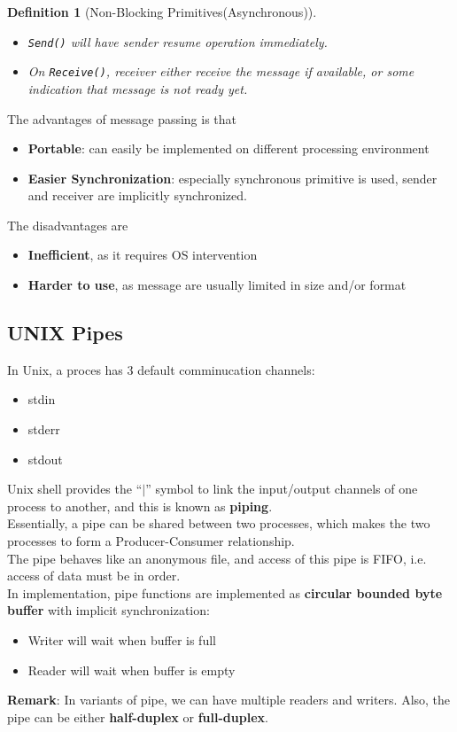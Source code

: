 \documentclass[11pt]{article}
\newtheorem{definition}{Definition}[section]
\theoremstyle{definition}
\begin{document}
\begin{definition}[Non-Blocking Primitives(Asynchronous)]
\normalfont 
\begin{itemize}[itemsep=0pt]
  \item \texttt{Send()} will have sender resume operation immediately.
  \item On \texttt{Receive()}, receiver either receive the message if available, or some indication that message is not ready yet.
\end{itemize}
\end{definition} 
The advantages of message passing is that
\begin{itemize}[itemsep=0pt]
  \item \textbf{Portable}: can easily be implemented on different processing environment
  \item \textbf{Easier Synchronization}: especially synchronous primitive is used, sender and receiver are implicitly synchronized.
\end{itemize}
The disadvantages are 
\begin{itemize}[itemsep=0pt]
  \item \textbf{Inefficient}, as it requires OS intervention
  \item \textbf{Harder to use}, as message are usually limited in size and/or format
\end{itemize}
\subsection{UNIX Pipes}
In Unix, a proces has 3 default comminucation channels:
\begin{itemize}[itemsep=0pt]
  \item stdin
  \item stderr
  \item stdout
\end{itemize}
Unix shell provides the ``$\mid$'' symbol to link the input/output channels of one process to another, and this is known as \textbf{piping}.\\
Essentially, a pipe can be shared between two processes, which makes the two processes to form a Producer-Consumer relationship.\\
The pipe behaves like an anonymous file, and access of this pipe is FIFO, i.e. access of data must be in order.\\

In implementation, pipe functions are implemented as \textbf{circular bounded byte buffer} with implicit synchronization:
\begin{itemize}[itemsep=0pt]
\item Writer will wait when buffer is full
\item Reader will wait when buffer is empty
\end{itemize} 
\textbf{Remark}: In variants of pipe, we can have multiple readers and writers. Also, the pipe can be either \textbf{half-duplex} or \textbf{full-duplex}.\\
\end{document}
